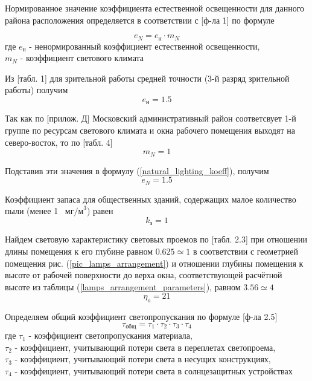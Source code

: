 Нормированное значение коэффициента естественной освещенности для данного
района расположения определяется в соответствии с \cite{ecology_snip_23_05_95}[ф-ла 1]
по формуле

\begin{equation}
    e_N = e_\text{н} \cdot m_N
    \label{natural_lighting_koeff}
\end{equation}
где $e_\text{н}$ - ненормированный коэффициент естественной освещенности, \\
$m_N$ - коэффициент светового климата

Из \cite{ecology_snip_23_05_95}[табл. 1] для зрительной работы средней точности
(3-й разряд зрительной работы) получим
$$
    e_\text{н} = 1.5
$$

Так как по \cite{ecology_snip_23_05_95}[прилож. Д] Московский административный
район соответсвует 1-й группе по ресурсам светового климата и окна рабочего
помещения выходят на северо-восток, то по \cite{ecology_snip_23_05_95}[табл. 4]
$$
    m_N = 1
$$

Подставив эти значения в формулу (\ref{natural_lighting_koeff}), получим
$$
    e_N = 1.5
$$

Коэффициент запаса для общественных зданий, содержащих малое количество пыли
(менее 1 ~$\text{мг/м}^3$) равен
$$
    k_\text{з} = 1
$$

Найдем световую характеристику световых проемов по
\cite{lighting_calc_method}[табл. 2.3] при отношении длины помещения к его глубине
равном $0.625 \simeq 1$ в соответствии с геометрией помещения рис. (\ref{pic_lamps_arrangement})
и отношении глубины помещения к высоте от рабочей поверхности до верха окна,
соответствующей расчётной высоте из таблицы (\ref{lamps_arrangement_parameters}),
равном $3.56 \simeq 4$
$$
    \eta_o = 21
$$

Определяем общий коэффициент светопропускания по формуле
\cite{lighting_calc_method}[ф-ла 2.5]
\begin{equation}
    \tau_\text{общ} = \tau_1 \cdot \tau_2 \cdot \tau_3 \cdot \tau_4
    \label{overall_light_pass_koeff}
\end{equation}
где $\tau_1$ - коэффициент светопропускания материала,                          \\
$\tau_2$ - коэффициент, учитывающий потери света в переплетах светопроема,      \\
$\tau_3$ - коэффициент, учитывающий потери света в несущих конструкциях,        \\
$\tau_4$ - коэффициент, учитывающий потери света в солнцезащитных устройствах

